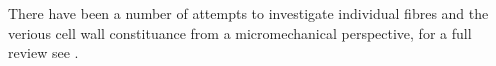 There have been a number of attempts to investigate individual fibres and the verious cell wall constituance from a micromechanical perspective, for a full review see \cite{Eder_2012}.